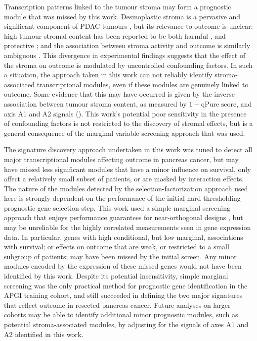 \documentclass[dissertation.tex]{subfiles}
\begin{document}
Transcription patterns linked to the tumour stroma may form a prognostic module that was missed by this work.  Desmoplastic stroma is a pervasive and significant component of \gls{PDAC} tumours \cite{Hidalgo2010}, but its relevance to outcome is unclear: high tumour stromal content has been reported to be both harmful \cite{Luo2012, Provenzano2012}, and protective \cite{Rhim2014, Sinn2014}; and the association between stroma activity and outcome is similarly ambiguous \cite{Bever2014, Sinn2014}.  This divergence in experimental findings suggests that the effect of the stroma on outcome is modulated by uncontrolled confounding factors.  In such a situation, the approach taken in this work can not reliably identify stroma-associated transcriptional modules, even if these modules are genuinely linked to outcome.  Some evidence that this may have occurred is given by the inverse association between tumour stroma content, as measured by $1 - \mbox{qPure score}$, and axis A1 and A2 signals ().  This work's potential poor sensitivity in the presence of confounding factors is not restricted to the discovery of stromal effects, but is a general consequence of the marginal variable screening approach that was used.

The signature discovery approach undertaken in this work was tuned to detect all major transcriptional modules affecting outcome in pancreas cancer, but may have missed less significant modules that have a minor influence on survival, only affect a relatively small subset of patients, or are masked by interaction effects.  The nature of the modules detected by the selection-factorization approach used here is strongly dependent on the performance of the initial hard-thresholding prognostic gene selection step.  This work used a simple marginal screening approach that enjoys performance guarantees for near-orthogonal designs \cite{Fan2008}, but may be unreliable for the highly correlated measurements seen in gene expression data.  In particular, genes with high conditional, but low marginal, associations with survival; or effects on outcome that are weak, or restricted to a small subgroup of patients; may have been missed by the initial screen.  Any minor modules encoded by the expression of these missed genes would not have been identified by this work.  Despite its potential insensitivity, simple marginal screening was the only practical method for prognostic gene identification in the \gls{APGI} training cohort, and still succeeded in defining the two major signatures that reflect outcome in resected pancreas cancer.  Future analyses on larger cohorts may be able to identify additional minor prognostic modules, such as potential stroma-associated modules, by adjusting for the signals of axes A1 and A2 identified in this work.
\end{document}
